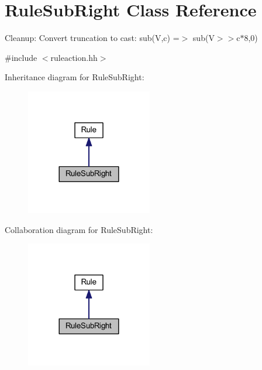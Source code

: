 \hypertarget{class_rule_sub_right}{}\section{Rule\+Sub\+Right Class Reference}
\label{class_rule_sub_right}


Cleanup\+: Convert truncation to cast\+: {\ttfamily sub(\+V,c) =$>$ sub(V$>$$>$c$\ast$8,0)}  




{\ttfamily \#include $<$ruleaction.\+hh$>$}



Inheritance diagram for Rule\+Sub\+Right\+:
\nopagebreak
\begin{figure}[H]
\begin{center}
\leavevmode
\includegraphics[width=156pt]{class_rule_sub_right__inherit__graph}
\end{center}
\end{figure}


Collaboration diagram for Rule\+Sub\+Right\+:
\nopagebreak
\begin{figure}[H]
\begin{center}
\leavevmode
\includegraphics[width=156pt]{class_rule_sub_right__coll__graph}
\end{center}
\end{figure}
